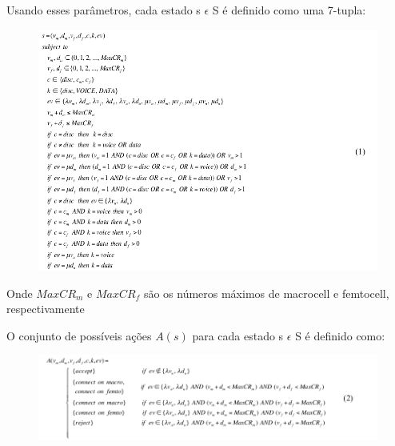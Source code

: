 \begin{frame}
  \footnotesize Usando esses parâmetros, cada estado \alert{s $\epsilon$ S} é definido como uma 7-tupla:
  \begin{figure}
    \includegraphics [scale=0.30]{./Figures/f1}
  \end{figure}
  \footnotesize Onde $MaxCR _{m}$ e $MaxCR _{f}$ são os números máximos de macrocell e femtocell, respectivamente  
\end{frame}

\begin{frame}
  \footnotesize O conjunto de possíveis ações \alert{$A(s)$} para cada estado \alert{s $\epsilon$ S} é definido como:
  \begin{figure}
    \includegraphics [scale=0.37]{./Figures/f2}
  \end{figure}  
\end{frame}

